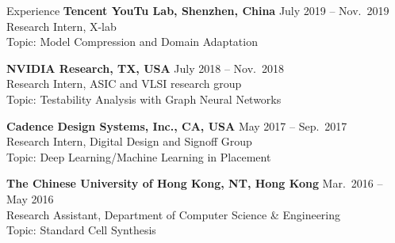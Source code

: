 
\begin{rSection}{Experience}
{\bf Tencent YouTu Lab, Shenzhen, China}               \hfill { July 2019 -- Nov.~2019} \\
Research Intern, X-lab\\
Topic: Model Compression and Domain Adaptation
    
{\bf NVIDIA Research, TX, USA}               \hfill { July 2018 -- Nov.~2018} \\
Research Intern, ASIC and VLSI research group\\
Topic: Testability Analysis with Graph Neural Networks

{\bf Cadence Design Systems, Inc., CA, USA}               \hfill { May 2017 -- Sep.~2017} \\
Research Intern, Digital Design and Signoff Group\\
Topic: Deep Learning/Machine Learning in Placement

{\bf The Chinese University of Hong Kong, NT, Hong Kong}  \hfill { Mar.~2016 -- May 2016} \\ 
Research Assistant, Department of Computer Science \& Engineering \\
Topic: Standard Cell Synthesis

\end{rSection}


